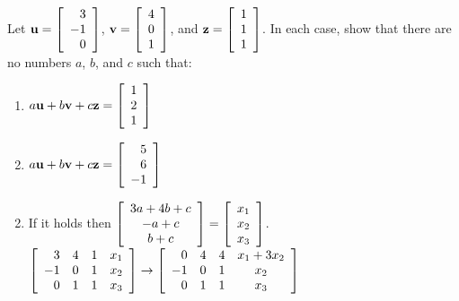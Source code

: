\begin{multicols}{2}
\begin{ex}
Let 
$\textbf{u} = \left[
\begin{array}{r}
3\\
-1\\
0
\end{array}
\right]$,
$\textbf{v} = \left[
\begin{array}{r}
4\\
0\\
1
\end{array}
\right]$, and 
$\textbf{z} = \left[
\begin{array}{r}
1\\
1\\
1
\end{array}
\right]$. In each case, show that there are no numbers $a$, $b$, and $c$ such that:


\begin{enumerate}[label={\alph*.}]
\item 
$a\textbf{u} + b\textbf{v} + c\textbf{z} = \left[
\begin{array}{r}
1\\
2\\
1
\end{array}
\right]$


\item
$a\textbf{u} + b\textbf{v} + c\textbf{z} = \left[
\begin{array}{r}
5\\
6\\
-1
\end{array}
\right]$


\end{enumerate}
\begin{sol}
\begin{enumerate}[label={\alph*.}]
\setcounter{enumi}{1}
\item If it holds then 
$\left[
\begin{array}{c}
3a + 4b + c\\
-a + c\\
b + c
\end{array}
\right]
=
\left[
\begin{array}{c}
x_{1}\\
x_{2}\\
x_{3}
\end{array}
\right]$. \\ \hspace*{-2em}$\left[
\begin{array}{rrrr}
3 & 4 & 1 & x_{1}\\
-1 & 0 & 1 & x_{2}\\
0 & 1 & 1 & x_{3}
\end{array}
\right] \to \left[
\begin{array}{rrrc}
0 & 4 & 4 & x_{1} + 3x_{2}\\
-1 & 0 & 1 & x_{2}\\
0 & 1 & 1 & x_{3}
\end{array}
\right]$


\end{enumerate}
\end{sol}
\end{ex}
\end{multicols}
